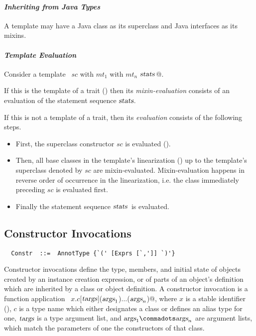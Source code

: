 

\paragraph{\em Inheriting from Java Types} A template may have a Java class as
its superclass and Java interfaces as its mixins. 

\paragraph{\em Template Evaluation}
Consider a template ~\lstinline@$sc$ with $mt_1$ with $mt_n$ {$\mbox{\sl stats}\,$}@.

If this is the template of a trait () then its {\em
mixin-evaluation} consists of an evaluation of the statement sequence
$\mbox{\sl stats}$.

If this is not a template of a trait, then its {\em evaluation}
consists of the following steps.
\begin{itemize}
\item
First, the superclass constructor $sc$ is evaluated ().
\item
Then, all base classes in the template's linearization
() up to the
template's superclass denoted by $sc$ are
mixin-evaluated. Mixin-evaluation happens in reverse order of
occurrence in the linearization, i.e. the class immediately preceding
$sc$ is evaluated first.
\item 
Finally the statement sequence $\mbox{\sl stats}\,$ is evaluated.
\end{itemize}

\subsection{Constructor Invocations}
\label{sec:constr-invoke}
\syntax\begin{lstlisting}
  Constr  ::=  AnnotType {`(' [Exprs [`,']] `)'}
\end{lstlisting}

Constructor invocations define the type, members, and initial state of
objects created by an instance creation expression, or of parts of an
object's definition which are inherited by a class or object
definition. A constructor invocation is a function application
~\lstinline@$x$.$c$[$\mbox{\sl targs}$]($\mbox{\sl args}_1$)$\ldots$($\mbox{\sl args}_n$)@, where $x$ is a stable identifier
(), $c$ is a type name which either designates a
class or defines an alias type for one, $\mbox{\sl targs}$ is a type argument
list, and $\args_1 \commadots \args_n$ are argument lists, which match
the parameters of one the constructors of that class. 


